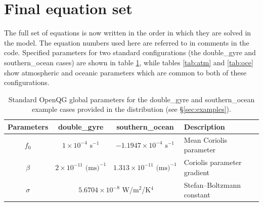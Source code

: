 \documentclass[11pt, a4paper,twoside]{article}
\numberwithin{equation}{section}
\begin{document}
\section{Final equation set}
The full set of equations is now written in the order in which they are solved in the model.
The equation numbers used here are referred to in comments in the code.
Specified parameters for two standard configurations (the double\_gyre and southern\_ocean cases) are shown in table \ref{tab:standard}, while tables \ref{tab:atm} and \ref{tab:oce} show atmospheric and oceanic parameters which are common to both of these configurations.

\begin{table}[!t]
  \begin{center}
    \begin{tabular}{cccl}
\hline
Parameters  & \hspace{4mm}double\_gyre\hspace{4mm} &  \hspace{4mm}southern\_ocean\hspace{4mm} & Description\hspace{4mm} \\
\hline
$f_0$ & $1 \times 10^{-4} \textrm{ s}^{-1}$ & $-1.1947 \times 10^{-4} \textrm{ s}^{-1}$ &Mean Coriolis parameter \\
$\beta$ & $2 \times 10^{-11} \textrm{ (ms)}^{-1}$& $1.313 \times 10^{-11} \textrm{ (ms)}^{-1}$& Coriolis parameter gradient\\
$\sigma$ & \multicolumn{2}{c}{$5.6704 \times 10^{-8}$ W/m$^2$/K$^4$} & Stefan--Boltzmann constant\\
\hline
    \end{tabular}
  \end{center}
\caption{\small Standard OpenQG global parameters for the double\_gyre and southern\_ocean example cases provided in the distribution (see \S\ref{sec:examples}). \label{tab:standard}}
\end{table}
\end{document}
